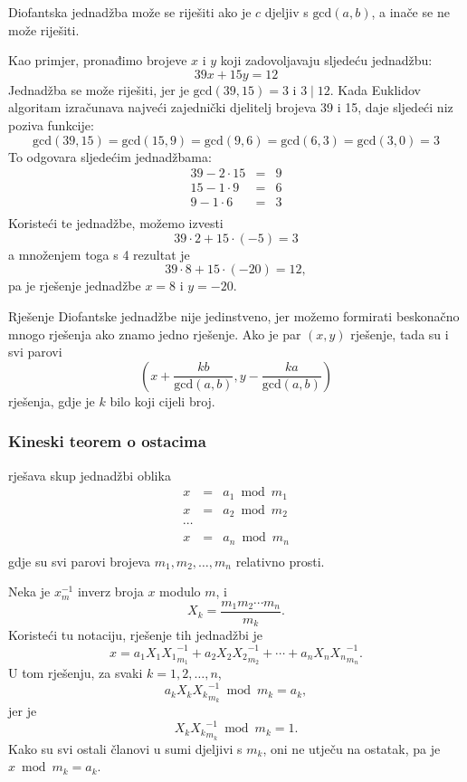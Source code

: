 Diofantska jednadžba može se riješiti ako je
$c$ djeljiv s
$\textrm{gcd}(a,b)$, a
inače se ne može riješiti.

Kao primjer, pronađimo brojeve $x$ i $y$
koji zadovoljavaju sljedeću jednadžbu:
\[
39x + 15y = 12
\]
Jednadžba se može riješiti, jer je
$\textrm{gcd}(39,15)=3$ i $3 \mid 12$.
Kada Euklidov algoritam izračunava
najveći zajednički djelitelj brojeva 39 i 15,
daje sljedeći niz poziva funkcije:
\[
\textrm{gcd}(39,15) = \textrm{gcd}(15,9)
= \textrm{gcd}(9,6) = \textrm{gcd}(6,3)
= \textrm{gcd}(3,0) = 3 \]
To odgovara sljedećim jednadžbama:
\[
\begin{array}{lcl}
39 - 2 \cdot 15 & = & 9 \\
15 - 1 \cdot 9 & = & 6 \\
9 - 1 \cdot 6 & = & 3 \\
\end{array}
\]
Koristeći te jednadžbe, možemo izvesti
\[
39 \cdot 2 + 15 \cdot (-5) = 3
\]
a množenjem toga s 4 rezultat je
\[
39 \cdot 8 + 15 \cdot (-20) = 12,
\]
pa je rješenje jednadžbe
$x=8$ i $y=-20$.

Rješenje Diofantske jednadžbe nije jedinstveno,
jer možemo formirati beskonačno mnogo rješenja
ako znamo jedno rješenje.
Ako je par $(x,y)$ rješenje, tada su i svi parovi
\[(x+\frac{kb}{\textrm{gcd}(a,b)},y-\frac{ka}{\textrm{gcd}(a,b)})\]
rješenja, gdje je $k$ bilo koji cijeli broj.

\subsubsection{Kineski teorem o ostacima}


 rješava
skup jednadžbi oblika
\[
\begin{array}{lcl}
x & = & a_1 \bmod m_1 \\
x & = & a_2 \bmod m_2 \\
\cdots \\
x & = & a_n \bmod m_n \\
\end{array}
\]
gdje su svi parovi brojeva $m_1,m_2,\ldots,m_n$ relativno prosti.

Neka je $x^{-1}_m$ inverz broja $x$ modulo $m$, i
\[ X_k = \frac{m_1 m_2 \cdots m_n}{m_k}.\]
Koristeći tu notaciju, rješenje tih jednadžbi je
\[x = a_1 X_1 {X_1}^{-1}_{m_1} + a_2 X_2 {X_2}^{-1}_{m_2} + \cdots + a_n X_n {X_n}^{-1}_{m_n}.\]
U tom rješenju, za svaki $k=1,2,\ldots,n$,
\[a_k X_k {X_k}^{-1}_{m_k} \bmod m_k = a_k,\]
jer je
\[X_k {X_k}^{-1}_{m_k} \bmod m_k = 1.\]
Kako su svi ostali članovi u sumi djeljivi s $m_k$,
oni ne utječu na ostatak,
pa je $x \bmod m_k = a_k$.

